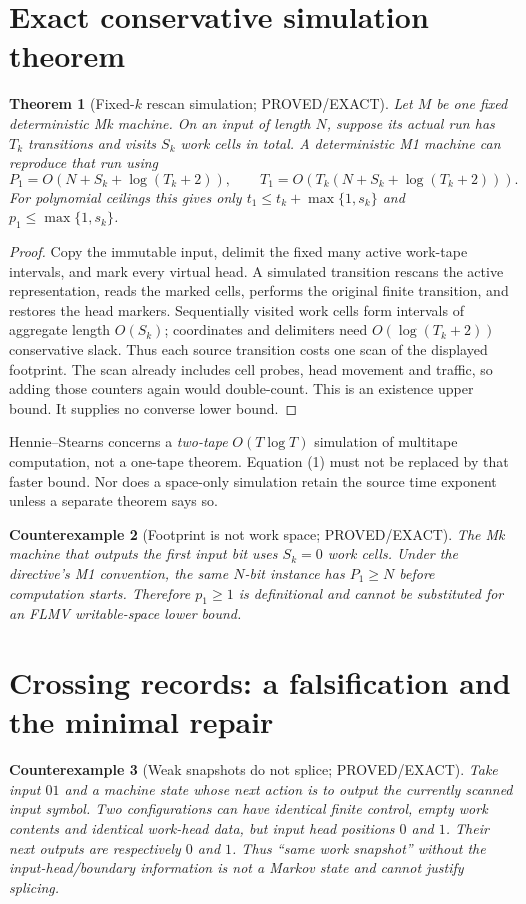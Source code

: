 \documentclass[11pt]{article}
\newtheorem{theorem}{Theorem}
\newtheorem{counterexample}[theorem]{Counterexample}
\begin{document}
\section{Exact conservative simulation theorem}
\begin{theorem}[Fixed-$k$ rescan simulation; PROVED/EXACT]
Let $M$ be one fixed deterministic Mk machine.  On an input of length $N$,
suppose its actual run has $T_k$ transitions and visits $S_k$ work cells in
total.  A deterministic M1 machine can reproduce that run using
\[
 P_1=O(N+S_k+\log(T_k+2)),\qquad
 T_1=O\!\left(T_k(N+S_k+\log(T_k+2))\right).
\tag{1}
\]
For polynomial ceilings this gives only
$t_1\le t_k+\max\{1,s_k\}$ and $p_1\le\max\{1,s_k\}$.
\end{theorem}
\begin{proof}
Copy the immutable input, delimit the fixed many active work-tape intervals,
and mark every virtual head.  A simulated transition rescans the active
representation, reads the marked cells, performs the original finite
transition, and restores the head markers.  Sequentially visited work cells
form intervals of aggregate length $O(S_k)$; coordinates and delimiters need
$O(\log(T_k+2))$ conservative slack.  Thus each source transition costs one
scan of the displayed footprint.  The scan already includes cell probes,
head movement and traffic, so adding those counters again would double-count.
This is an existence upper bound.  It supplies no converse lower bound.
\end{proof}

Hennie--Stearns concerns a \emph{two-tape} $O(T\log T)$ simulation of
multitape computation, not a one-tape theorem.  Equation (1) must not be
replaced by that faster bound.  Nor does a space-only simulation retain the
source time exponent unless a separate theorem says so.

\begin{counterexample}[Footprint is not work space; PROVED/EXACT]
The Mk machine that outputs the first input bit uses $S_k=0$ work cells.
Under the directive's M1 convention, the same $N$-bit instance has
$P_1\ge N$ before computation starts.  Therefore $p_1\ge1$ is definitional
and cannot be substituted for an FLMV writable-space lower bound.
\end{counterexample}

\section{Crossing records: a falsification and the minimal repair}
\begin{counterexample}[Weak snapshots do not splice; PROVED/EXACT]
Take input $01$ and a machine state whose next action is to output the
currently scanned input symbol.  Two configurations can have identical
finite control, empty work contents and identical work-head data, but input
head positions $0$ and $1$.  Their next outputs are respectively $0$ and $1$.
Thus ``same work snapshot'' without the input-head/boundary information is
not a Markov state and cannot justify splicing.
\end{counterexample}
\end{document}
